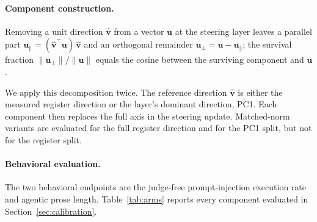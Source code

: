 \paragraph{Component construction.}
Removing a unit direction $\hat{\mathbf{v}}$ from a vector $\mathbf{u}$ at
the steering layer leaves a parallel part
$\mathbf{u}_{\parallel} = (\hat{\mathbf{v}}^{\top}\mathbf{u})\,\hat{\mathbf{v}}$
and an orthogonal remainder $\mathbf{u}_{\perp} = \mathbf{u} - \mathbf{u}_{\parallel}$;
the survival fraction $\lVert\mathbf{u}_{\perp}\rVert/\lVert\mathbf{u}\rVert$
equals the cosine between the surviving component and $\mathbf{u}$.

We apply this decomposition twice. The reference direction
$\hat{\mathbf{v}}$ is either the measured register direction or the layer's
dominant direction, PC1. Each component then replaces the full axis in the
steering update. Matched-norm variants are evaluated for the full register
direction and for the PC1 split, but not for the register split.

\paragraph{Behavioral evaluation.}
The two behavioral endpoints are the judge-free prompt-injection execution rate
and agentic prose length. Table~\ref{tab:arms} reports every component evaluated
in Section~\ref{sec:calibration}.

